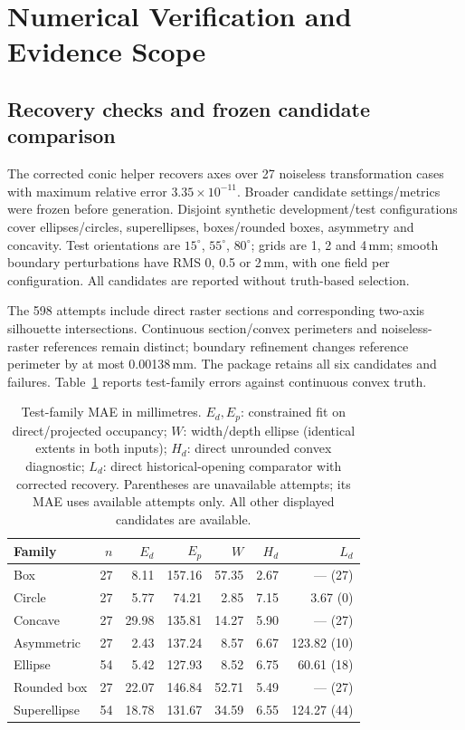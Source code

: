\documentclass[11pt,a4paper]{article}
\begin{document}
\section{Numerical Verification and Evidence Scope}
\subsection{Recovery checks and frozen candidate comparison}
The corrected conic helper recovers axes over 27 noiseless transformation cases with maximum relative error $3.35\times10^{-11}$. Broader candidate settings/metrics were frozen before generation. Disjoint synthetic development/test configurations cover ellipses/circles, superellipses, boxes/rounded boxes, asymmetry and concavity. Test orientations are $15^\circ$, $55^\circ$, $80^\circ$; grids are 1, 2 and 4\,mm; smooth boundary perturbations have RMS 0, 0.5 or 2\,mm, with one field per configuration. All candidates are reported without truth-based selection.

The 598 attempts include direct raster sections and corresponding two-axis silhouette intersections. Continuous section/convex perimeters and noiseless-raster references remain distinct; boundary refinement changes reference perimeter by at most 0.00138\,mm. The package retains all six candidates and failures. Table~\ref{tab:candidates} reports test-family errors against continuous convex truth.

\begin{table}[htbp]
\centering\small
\caption{Test-family MAE in millimetres. $E_d,E_p$: constrained fit on direct/projected occupancy; $W$: width/depth ellipse (identical extents in both inputs); $H_d$: direct unrounded convex diagnostic; $L_d$: direct historical-opening comparator with corrected recovery. Parentheses are unavailable attempts; its MAE uses available attempts only. All other displayed candidates are available.}
\label{tab:candidates}
\begin{tabular}{lrrrrrr}
\toprule
Family & $n$ & $E_d$ & $E_p$ & $W$ & $H_d$ & $L_d$\\
\midrule
Box &27&8.11&157.16&57.35&2.67&--- (27)\\
Circle &27&5.77&74.21&2.85&7.15&3.67 (0)\\
Concave &27&29.98&135.81&14.27&5.90&--- (27)\\
Asymmetric &27&2.43&137.24&8.57&6.67&123.82 (10)\\
Ellipse &54&5.42&127.93&8.52&6.75&60.61 (18)\\
Rounded box &27&22.07&146.84&52.71&5.49&--- (27)\\
Superellipse &54&18.78&131.67&34.59&6.55&124.27 (44)\\
\bottomrule
\end{tabular}
\end{table}
\end{document}

